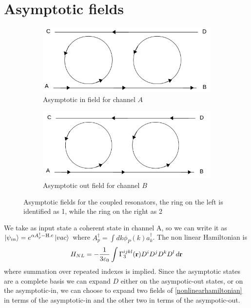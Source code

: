 \section{Asymptotic fields}
\begin{figure}[H]
\centering
\begin{subfigure}{0.5\textwidth}
\centering
\includegraphics[width = \textwidth]{img/Asyina}
\caption{Asymptotic in field for channel $A$}
\end{subfigure}%
\begin{subfigure}{0.5\textwidth}
\includegraphics[width = \textwidth]{img/Asyoutb}
\caption{Asymptotic out field for channel $B$}
\end{subfigure}
\caption{Asymptotic fields for the coupled resonators, the ring on the left is identified as 1, while the ring on the right as 2}\label{asyfields}
\end{figure}
We take as input state a coherent state in channel A, so we can write it as $\ket{\psi_{in}} = e^{\alpha A_p^\dagger - \text{H.c}}\ket{vac}$ where $A_p^\dagger = \int dk \phi_P(k) a_k^\dagger$. The non linear Hamiltonian is \cite{Sipe2004}
\begin{equation}\label{nonlinearhamiltonian}H_{NL} = -\frac{1}{3\varepsilon_0}\int\Gamma^{ijkl}_3(\mathbf{r})D^iD^jD^kD^l\,d\mathbf{r}\end{equation}
where summation over repeated indexes is implied. Since the asymptotic states are a complete basis we can expand $D$ either on the asympotic-out states, or on the asymptotic-in, we can choose to expand two fields of \eqref{nonlinearhamiltonian} in terms of the asymptotic-in and the other two in terms of the asympotic-out.
